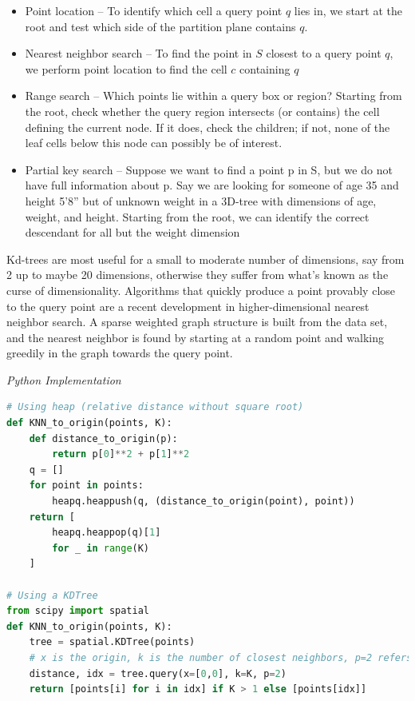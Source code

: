 \documentclass{article}
\begin{document}
    \begin{itemize}
        \item Point location – To identify which cell a query point $q$ lies in, we start at the root and test which side of the partition plane contains $q$.
        
        \item Nearest neighbor search – To find the point in $S$ closest to a query point $q$, we perform point location to find the cell $c$ containing $q$
        
        \item Range search – Which points lie within a query box or region? Starting from the root, check whether the query region intersects (or contains) the cell defining the current node. If it does, check the children; if not, none of the leaf cells below this node can possibly be of interest.
        
        \item Partial key search – Suppose we want to find a point p in S, but we do not have full information about p. Say we are looking for someone of age 35 and height 5’8” but of unknown weight in a 3D-tree with dimensions of age, weight, and height. Starting from the root, we can identify the correct descendant for all but the weight dimension
    \end{itemize}
    
    Kd-trees are most useful for a small to moderate number of dimensions, say from 2 up to maybe 20 dimensions, otherwise they suffer from what's known as the curse of dimensionality. Algorithms that quickly produce a point provably close to the query point are a recent development in higher-dimensional nearest neighbor search. A sparse weighted graph structure is built from the data set, and the nearest neighbor is found by starting at a random point and walking greedily in the graph towards the query point.
    
\vspace{8pt} \emph{Python Implementation}
\begin{lstlisting}[language=Python]
# Using heap (relative distance without square root)
def KNN_to_origin(points, K):
    def distance_to_origin(p):
        return p[0]**2 + p[1]**2
    q = []
    for point in points:
        heapq.heappush(q, (distance_to_origin(point), point))
    return [
        heapq.heappop(q)[1]
        for _ in range(K)
    ]

# Using a KDTree
from scipy import spatial
def KNN_to_origin(points, K):
    tree = spatial.KDTree(points)
	# x is the origin, k is the number of closest neighbors, p=2 refers to choosing L2 norm (euclidean distance)
    distance, idx = tree.query(x=[0,0], k=K, p=2) 
    return [points[i] for i in idx] if K > 1 else [points[idx]]
\end{lstlisting}
\end{document}
